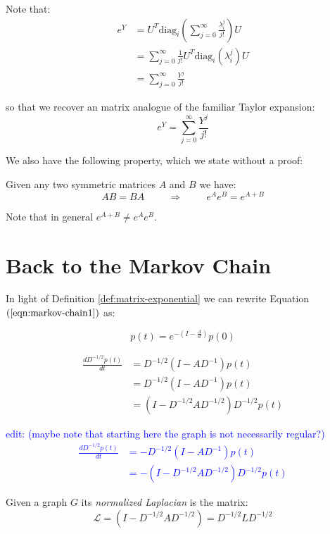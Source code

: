 \documentclass[11pt]{article}
\begin{document}
Note that:
\begin{align*}
    e^Y &= U^T\text{diag}_i\left(\sum_{j=0}^{\infty}\frac{\lambda_i^j}{j!}\right)U\\
    &= \sum_{j=0}^{\infty}\frac{1}{j!} U^T\text{diag}_i(\lambda_i^j)U\\
    &= \sum_{j=0}^{\infty}\frac{Y^j}{j!}
\end{align*}

so that we recover an matrix analogue of the familiar Taylor expansion:
\[
\boxed{e^Y = \sum_{j=0}^{\infty}\frac{Y^j}{j!}}
\]

We also have the following property, which we state without a proof:
\begin{proposition}
Given any two symmetric matrices $A$ and $B$ we have:
\[
    AB = BA \hspace{1cm} \Rightarrow \hspace{1cm} e^{A}e^{B} = e^{A+B}
\]
\end{proposition}

Note that in general $e^{A+B} \neq e^Ae^B$.

\section*{Back to the Markov Chain}
In light of Definition \ref{def:matrix-exponential} we can rewrite Equation $(\ref{eqn:markov-chain1})$ as:

\[
    p(t) = e^{-\left(I - \frac{A}{d}\right)}p(0)
\]

\begin{align*}
    \frac{dD^{-1/2}p(t)}{dt} &= D^{-1/2}(I-AD^{-1})p(t)\\
    &= D^{-1/2}(I-AD^{-1})p(t)\\
    &= (I-D^{-1/2}AD^{-1/2})D^{-1/2}p(t)
\end{align*}

\textcolor{blue}{edit: (maybe note that starting here the graph is not necessarily regular?)
\begin{align*}
    \frac{dD^{-1/2}p(t)}{dt} &= -D^{-1/2}(I-AD^{-1})p(t)\\
    &= - (I-D^{-1/2}AD^{-1/2})D^{-1/2}p(t)
\end{align*}
}


\begin{definition}
Given a graph $G$ its \emph{normalized Laplacian} is the matrix:
\[
    \mathcal{L} = (I- D^{-1/2}AD^{-1/2}) = D^{-1/2}L D^{-1/2}
\]
\end{definition}
\end{document}
